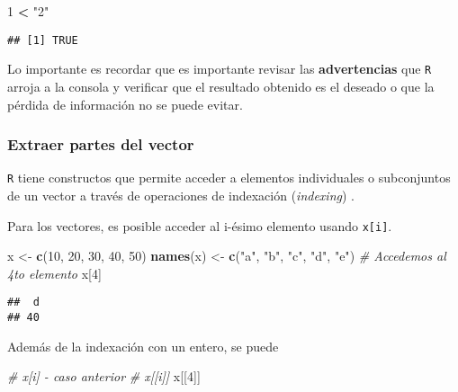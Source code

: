 \documentclass[]{article}
\newenvironment{Shaded}{\begin{snugshade}}{\end{snugshade}}
\newcommand{\KeywordTok}[1]{\textcolor[rgb]{0.13,0.29,0.53}{\textbf{#1}}}
\newcommand{\DecValTok}[1]{\textcolor[rgb]{0.00,0.00,0.81}{#1}}
\newcommand{\StringTok}[1]{\textcolor[rgb]{0.31,0.60,0.02}{#1}}
\newcommand{\CommentTok}[1]{\textcolor[rgb]{0.56,0.35,0.01}{\textit{#1}}}
\newcommand{\OperatorTok}[1]{\textcolor[rgb]{0.81,0.36,0.00}{\textbf{#1}}}
\newcommand{\NormalTok}[1]{#1}
\begin{document}
\begin{Shaded}
\begin{Highlighting}[]
\DecValTok{1} \OperatorTok{<}\StringTok{ "2"}
\end{Highlighting}
\end{Shaded}

\begin{verbatim}
## [1] TRUE
\end{verbatim}

\begin{nota}
Lo importante es recordar que es importante revisar las \textbf{advertencias}
que \texttt{R} arroja a la consola y verificar que el resultado obtenido es el 
deseado o que la pérdida de información no se puede evitar.
\end{nota}

\subsubsection{Extraer partes del
vector}\label{extraer-partes-del-vector}

\texttt{R} tiene constructos que permite acceder a elementos
individuales o subconjuntos de un vector a través de operaciones de
indexación (\emph{indexing})
\parencite[][sección ``Indexing'']{rmanual}.

Para los vectores, es posible acceder al i-ésimo elemento usando
\texttt{x{[}i{]}}.

\begin{Shaded}
\begin{Highlighting}[]
\NormalTok{x <-}\StringTok{ }\KeywordTok{c}\NormalTok{(}\DecValTok{10}\NormalTok{, }\DecValTok{20}\NormalTok{, }\DecValTok{30}\NormalTok{, }\DecValTok{40}\NormalTok{, }\DecValTok{50}\NormalTok{)}
\KeywordTok{names}\NormalTok{(x) <-}\StringTok{ }\KeywordTok{c}\NormalTok{(}\StringTok{"a"}\NormalTok{, }\StringTok{"b"}\NormalTok{, }\StringTok{"c"}\NormalTok{, }\StringTok{"d"}\NormalTok{, }\StringTok{"e"}\NormalTok{)}
\CommentTok{# Accedemos al 4to elemento}
\NormalTok{x[}\DecValTok{4}\NormalTok{]}
\end{Highlighting}
\end{Shaded}

\begin{verbatim}
##  d 
## 40
\end{verbatim}

Además de la indexación con un entero, se puede

\begin{Shaded}
\begin{Highlighting}[]
\CommentTok{# x[i] - caso anterior}
\CommentTok{# x[[i]]}
\NormalTok{x[[}\DecValTok{4}\NormalTok{]]}
\end{Highlighting}
\end{Shaded}
\end{document}

